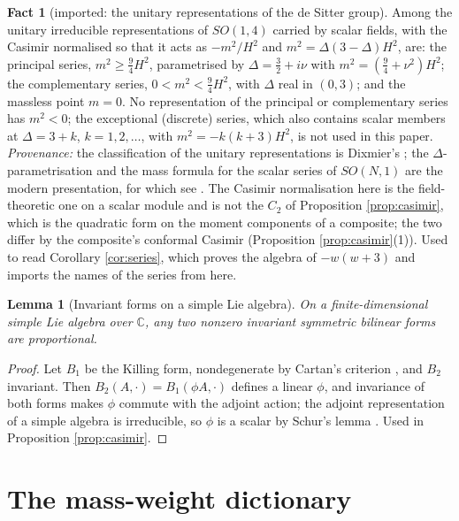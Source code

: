 \documentclass[11pt]{article}
\newtheorem{lemma}[theorem]{Lemma}
\theoremstyle{definition}
\newtheorem{fact}[theorem]{Fact}
\newcommand{\C}{\mathbb{C}}
\begin{document}
\begin{fact}[imported: the unitary representations of the de Sitter group]\label{fact:dixmier}
Among the unitary irreducible representations of $SO(1,4)$ carried by scalar fields, with the Casimir normalised so that it acts as $-m^{2}/H^{2}$ and $m^{2} = \Delta(3-\Delta)H^{2}$, are: the principal series, $m^{2} \ge \tfrac94 H^{2}$, parametrised by $\Delta = \tfrac32 + i\nu$ with $m^{2} = (\tfrac94 + \nu^{2})H^{2}$; the complementary series, $0 < m^{2} < \tfrac94 H^{2}$, with $\Delta$ real in $(0,3)$; and the massless point $m = 0$. No representation of the principal or complementary series has $m^{2} < 0$; the exceptional (discrete) series, which also contains scalar members at $\Delta = 3 + k$, $k = 1, 2, \dots$, with $m^{2} = -k(k+3)H^{2}$, is not used in this paper. \emph{Provenance:} the classification of the unitary representations is Dixmier's \cite[\S\S3--4]{Dixmier1961}; the $\Delta$-parametrisation and the mass formula for the scalar series of $SO(N,1)$ are the modern presentation, for which see \cite{Higuchi1987}. The Casimir normalisation here is the field-theoretic one on a scalar module and is not the $C_{2}$ of Proposition \ref{prop:casimir}, which is the quadratic form on the moment components of a composite; the two differ by the composite's conformal Casimir (Proposition \ref{prop:casimir}(1)). Used to read Corollary \ref{cor:series}, which proves the algebra of $-w(w+3)$ and imports the names of the series from here.
\end{fact}

\begin{lemma}[Invariant forms on a simple Lie algebra]\label{lem:invforms}
On a finite-dimensional simple Lie algebra over $\C$, any two nonzero invariant symmetric bilinear forms are proportional.
\end{lemma}

\begin{proof}
Let $B_{1}$ be the Killing form, nondegenerate by Cartan's criterion \cite[\S5.1]{Humphreys1972}, and $B_{2}$ invariant. Then $B_{2}(A, \cdot) = B_{1}(\phi A, \cdot)$ defines a linear $\phi$, and invariance of both forms makes $\phi$ commute with the adjoint action; the adjoint representation of a simple algebra is irreducible, so $\phi$ is a scalar by Schur's lemma \cite[\S6.1]{Humphreys1972}. Used in Proposition \ref{prop:casimir}.
\end{proof}

\section{The mass-weight dictionary}\label{sec:dictionary}
\end{document}
